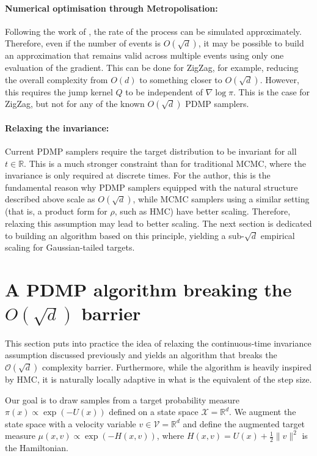 \documentclass{article}
\begin{document}
\paragraph{Numerical optimisation through Metropolisation: } Following the work of \cite{chevallier2025practicalpdmpsamplingmetropolis}, the rate of the process can be simulated approximately. Therefore, even if the number of events is $O(\sqrt{d})$, it may be possible to build an approximation that remains valid across multiple events using only one evaluation of the gradient. This can be done for ZigZag, for example, reducing the overall complexity from $O(d)$ to something closer to $O(\sqrt{d})$. However, this requires the jump kernel $Q$ to be independent of $\nabla \log \pi$. This is the case for ZigZag, but not for any of the known $O(\sqrt{d})$ PDMP samplers.

\paragraph{Relaxing the invariance: } Current PDMP samplers require the target distribution to be invariant for all $t \in \mathbb{R}$. This is a much stronger constraint than for traditional MCMC, where the invariance is only required at discrete times. For the author, this is the fundamental reason why PDMP samplers equipped with the natural structure described above scale as $O(\sqrt{d})$, while MCMC samplers using a similar setting (that is, a product form for $\rho$, such as HMC) have better scaling. Therefore, relaxing this assumption may lead to better scaling. The next section is dedicated to building an algorithm based on this principle, yielding a sub-$\sqrt{d}$ empirical scaling for Gaussian-tailed targets.
\section{A PDMP algorithm breaking the $O(\sqrt{d})$ barrier}
\label{sec:algorithm}

This section puts into practice the idea of relaxing the continuous-time invariance assumption discussed previously and yields an algorithm that breaks the $\mathcal{O}(\sqrt{d})$ complexity barrier. Furthermore, while the algorithm is heavily inspired by HMC, it is naturally locally adaptive in what is the equivalent of the step size. 

Our goal is to draw samples from a target probability measure $\pi(x) \propto \exp(-U(x))$ defined on a state space $\mathcal{X} = \mathbb{R}^d$. We augment the state space with a velocity variable $v \in \mathcal{V} = \mathbb{R}^d$ and define the augmented target measure $\mu(x, v) \propto \exp(-H(x, v))$, where $H(x, v) = U(x) + \frac{1}{2}\|v\|^2$ is the Hamiltonian.
\end{document}
